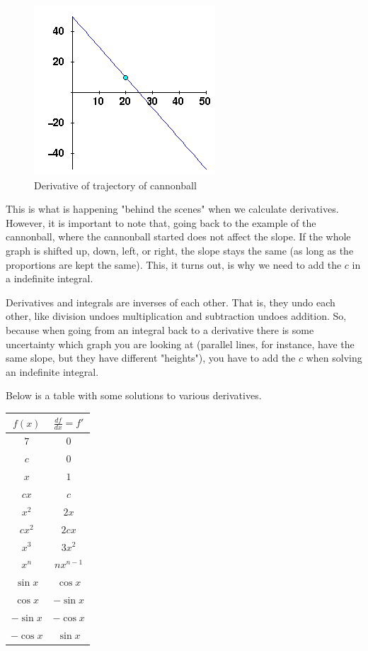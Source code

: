 \documentclass[12pt]{article}
\begin{document}
\begin{figure}[H]
\caption{Derivative of trajectory of cannonball}
\includegraphics[scale=0.8]{derivative.png}
\end{figure}

This is what is happening "behind the scenes" when we calculate derivatives.
However, it is important to note that, going back to the example of the cannonball, where the cannonball started does not affect the slope. 
If the whole graph is shifted up, down, left, or right, the slope stays the same (as long as the proportions are kept the same). 
This, it turns out, is why we need to add the $c$ in a indefinite integral. 

Derivatives and integrals are inverses of each other. 
That is, they undo each other, like division undoes multiplication and subtraction undoes addition. 
So, because when going from an integral back to a derivative there is some uncertainty which graph you are looking at (parallel lines, for instance, have the same slope, but they have different "heights"), you have to add the $c$ when solving an indefinite integral.

Below is a table with some solutions to various derivatives.

\begin{tabular}{c|c}
    $f(x)$ & $\frac{df}{dx} = f'$\\
    \hline
       $7$  & $0$ \\
        $c$ & $0$ \\
        $x$ & $1$ \\
        $cx$ & $c$ \\
        $x^2$ & $2x$ \\
        $cx^2$ & $2cx$ \\
        $x^3$ & $3x^2$ \\
        $x^n$ & $nx^{n-1}$ \\
        $\sin x$ & $\cos x$ \\
        $\cos x$ & $-\sin x$ \\
        $- \sin x$ & $- \cos x$ \\
        $-\cos x$ & $\sin x$
\end{tabular}
\end{document}
